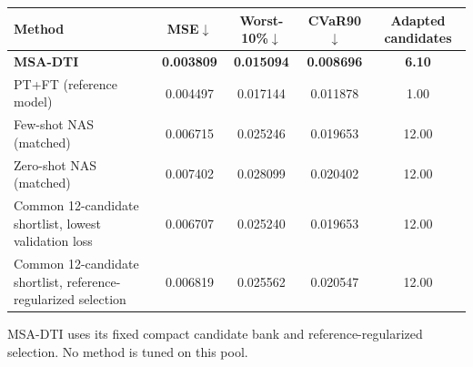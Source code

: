 \begin{center}
\begin{minipage}{\linewidth}
\label{tab:matched_control}
\centering
\scriptsize
\renewcommand{\arraystretch}{1.08}
\setlength{\tabcolsep}{3.0pt}
\begin{tabular*}{\linewidth}{@{\extracolsep{\fill}}lcccc@{}}
\toprule
Method & MSE$\downarrow$ & Worst-10\%$\downarrow$ &
CVaR90$\downarrow$ & Adapted candidates \\
\midrule
\textbf{MSA-DTI}
& \textbf{0.003809}
& \textbf{0.015094}
& \textbf{0.008696}
& \textbf{6.10} \\

PT+FT (reference model)
& 0.004497
& 0.017144
& 0.011878
& 1.00 \\

Few-shot NAS (matched)
& 0.006715
& 0.025246
& 0.019653
& 12.00 \\

Zero-shot NAS (matched)
& 0.007402
& 0.028099
& 0.020402
& 12.00 \\

Common 12-candidate shortlist, lowest validation loss
& 0.006707
& 0.025240
& 0.019653
& 12.00 \\

Common 12-candidate shortlist, reference-regularized selection
& 0.006819
& 0.025562
& 0.020547
& 12.00 \\
\bottomrule
\end{tabular*}

\vspace{2pt}
\par\footnotesize
MSA-DTI uses its fixed compact candidate bank and reference-regularized
selection. No method is tuned on this pool.
\end{minipage}
\end{center}
